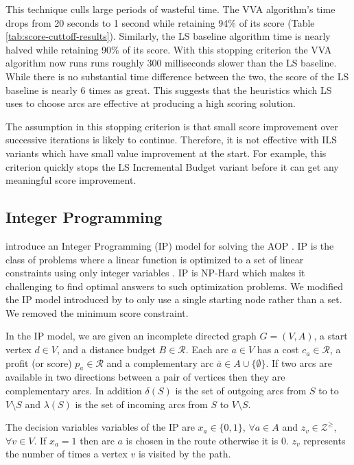 \documentclass[11pt]{article}
\newcommand{\RR}{\mathcal{R}} %
\newcommand{\ZZ}{\mathcal{Z}} %
\newcommand{\set}[1]{\ensuremath{\{{#1}\}}} %
\begin{document}
This technique culls large periods of wasteful time. The VVA algorithm's time drops from 20 seconds to 1 second while retaining 94\% of its score (Table \ref{tab:score-cuttoff-results}). Similarly, the LS baseline algorithm time is nearly halved while retaining 90\% of its score. With this stopping criterion the VVA algorithm now runs runs roughly 300 milliseconds slower than the LS baseline. While there is no substantial time difference between the two, the score of the LS baseline is nearly 6 times as great. This suggests that the heuristics which LS uses to choose arcs are effective at producing a high scoring solution.

The assumption in this stopping criterion is that small score improvement over successive iterations is likely to continue. Therefore, it is not effective with ILS variants which have small value improvement at the start. For example, this criterion quickly stops the LS Incremental Budget variant before it can get any meaningful score improvement. 


\subsection{Integer Programming}
\label{sec:int-programming}
\citeauthor{verbeeck2014extension} introduce an Integer Programming (IP) model for solving the AOP \cite{verbeeck2014extension}. IP is the class of problems where a linear function is optimized to a set of linear constraints using only integer variables \cite{ibm-int-programming}. IP is NP-Hard which makes it challenging to find optimal answers to such optimization problems. We modified the IP model introduced by \citeauthor{verbeeck2014extension} to only use a single starting node rather than a set. We removed the minimum score constraint.

In the IP model, we are given an incomplete directed graph $G = (V,A)$, a start vertex $d \in V$, and a distance budget $B \in \RR$. Each arc $a \in V$ has a cost $c_a \in \RR$, a profit (or score) $p_a \in \RR$ and a complementary arc $\bar{a} \in A \cup \set{\emptyset}$. If two arcs are available in two directions between a pair of vertices then they are complementary arcs. In addition $\delta(S)$ is the set of outgoing arcs from $S$ to to $V \setminus S$ and $\lambda(S)$ is the set of incoming arcs from $S$ to $V \setminus S$.

The decision variables variables of the IP are $x_a \in \set{0,1}$, $\forall a \in A$ and $z_v \in \ZZ^{\geq}$, $\forall v \in V$. If $x_a = 1$ then arc $a$ is chosen in the route otherwise it is 0. $z_v$ represents the number of times a vertex $v$ is visited by the path.
\end{document}
